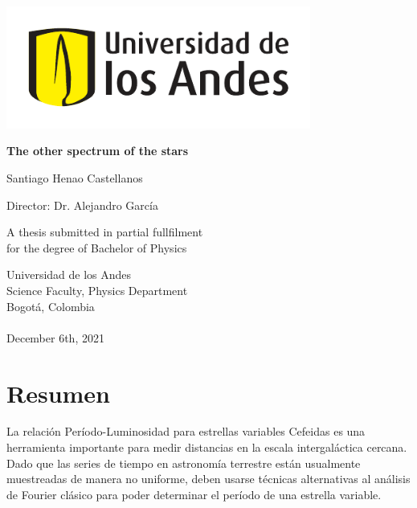 \documentclass[12pt,letterpaper,oneside]{book}
\begin{document}
	\begin{titlepage}
		\begin{center}
			\includegraphics[width=10cm]{img/logo-uniandes.pdf}
			
			\vspace{2cm}
			
			{\fontsize{25}{40}\selectfont \bf The other spectrum of the stars\par}
			
			\vspace{10mm}
			
			{\huge Santiago Henao Castellanos}
			
			\vspace{10mm}
			
			{\huge Director: Dr. Alejandro García } 
			
			\vspace{15mm}
			
			{\large
				A thesis submitted in partial fullfilment\\
				for the degree of Bachelor of Physics
			}
			
			\vspace{5mm}
			
			{\Large
				Universidad de los Andes\\
				Science Faculty, Physics Department\\
				Bogotá, Colombia\\ \phantom{} \\
				December 6th, 2021
			}
		\end{center}
	\end{titlepage}

\frontmatter

\chapter*{Resumen}

La relación Período-Luminosidad para estrellas variables Cefeidas es una herramienta importante para medir distancias en la escala intergaláctica cercana.
Dado que las series de tiempo en astronomía terrestre están usualmente muestreadas de manera no uniforme, 
deben usarse técnicas alternativas al análisis de Fourier clásico para poder determinar el período de una estrella variable.
\end{document}
